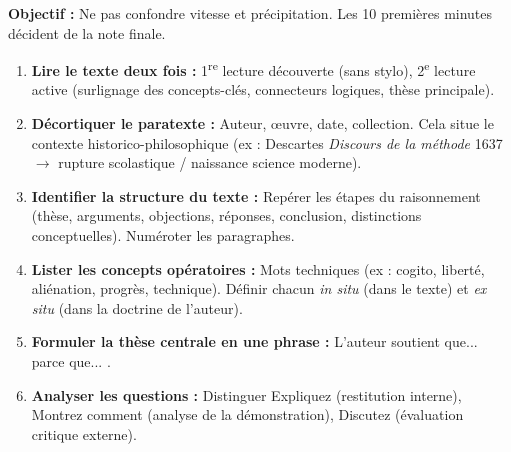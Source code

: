 \documentclass[11pt]{article}
\newcommand{\cle}[1]{{\popxbold\color{popdark}#1}}
\begin{document}
\begin{methode}
\textbf{Objectif :} Ne pas confondre vitesse et précipitation. Les 10 premières minutes décident de la note finale.
\begin{enumerate}
    \item \textbf{Lire le texte deux fois :} 1\textsuperscript{re} lecture \og découverte \fg (sans stylo), 2\textsuperscript{e} lecture \og active \fg (surlignage des concepts-clés, connecteurs logiques, thèse principale).
    \item \textbf{Décortiquer le paratexte :} Auteur, œuvre, date, collection. Cela situe le \cle{contexte historico-philosophique} (ex : Descartes \emph{Discours de la méthode} 1637 $\rightarrow$ rupture scolastique / naissance science moderne).
    \item \textbf{Identifier la structure du texte :} Repérer les \cle{étapes du raisonnement} (thèse, arguments, objections, réponses, conclusion, distinctions conceptuelles). Numéroter les paragraphes.
    \item \textbf{Lister les concepts opératoires :} Mots techniques (ex : \cle{cogito}, \cle{liberté}, \cle{aliénation}, \cle{progrès}, \cle{technique}). Définir chacun \emph{in situ} (dans le texte) et \emph{ex situ} (dans la doctrine de l'auteur).
    \item \textbf{Formuler la thèse centrale en une phrase :} \og L'auteur soutient que... parce que... \fg.
    \item \textbf{Analyser les questions :} Distinguer \og Expliquez \fg (restitution interne), \og Montrez comment \fg (analyse de la démonstration), \og Discutez \fg (évaluation critique externe).
\end{enumerate}
\end{methode}
\end{document}
